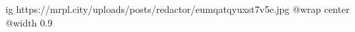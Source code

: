  
 
 
 
 

\ifcmt
  ig https://mrpl.city/uploads/posts/redactor/eumqatqyuxst7v5e.jpg
  @wrap center
  @width 0.9
\fi
